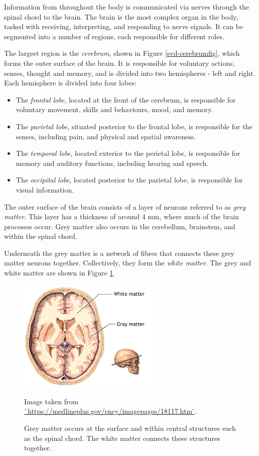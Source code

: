 Information from throughout the body is communicated via nerves through the spinal chord to the brain. The brain is the most complex organ in the body, tasked with receiving, interpreting, and responding to nerve signals. It can be segmented into a number of regions, each responsible for different roles.

The largest region is the \textit{cerebrum}, shown in Figure \ref{svd-cerebrumfig}, which forms the outer surface of the brain. It is responsible for voluntary actions, senses, thought and memory, and is divided into two hemispheres - left and right. Each hemisphere is divided into four lobes:
 \begin{itemize}
	\item The \textit{frontal lobe}, located at the front of the cerebrum, is responsible for voluntary movement, skills and behaviours, mood, and memory.
	\item The \textit{parietal lobe}, situated posterior to the frontal lobe, is responsible for the senses, including pain, and physical and spatial awareness.
	\item The \textit{temporal lobe}, located exterior to the perietal lobe, is responsible for memory and auditory functions, including hearing and speech.
	\item The \textit{occipital lobe}, located posterior to the parietal lobe, is responsible for visual information.
\end{itemize}

The outer surface of the brain consists of a layer of neurons referred to as \textit{grey matter}. This layer has a thickness of around 4 mm, where much of the brain processes occur. Grey matter also occurs in the cerebellum, brainstem, and within the spinal chord.

Underneath the grey matter is a network of fibres that connects these grey matter neurons together. Collectively, they form the \textit{white matter}. The grey and white matter are shown in Figure \ref{svd-greywhitefig}.

\begin{figure}[ht]
	\centering
	\includegraphics[width=0.6\textwidth]{Images/2_white_vs_grey.png}
	\caption{Grey matter occurs at the surface and within central structures such as the spinal chord. The white matter connects these structures together.}
	\small Image taken from \url{`https://medlineplus.gov/ency/imagepages/18117.htm'}.
	\label{svd-greywhitefig}
\end{figure}

